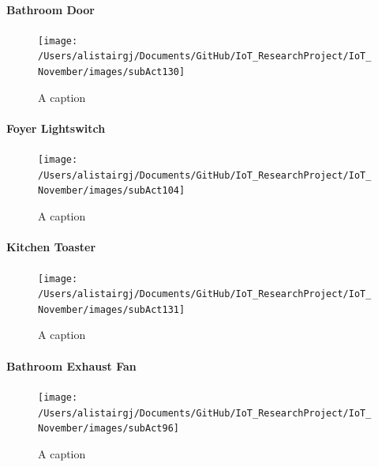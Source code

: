 \documentclass[11pt,]{article}
\let\oldparagraph\paragraph
\renewcommand{\paragraph}[1]{\oldparagraph{#1}\mbox{}}
\begin{document}
\hypertarget{bathroom-door}{%
\paragraph{Bathroom Door}\label{bathroom-door}}

\begin{figure}[H]

{\centering \texttt{[image: /Users/alistairgj/Documents/GitHub/IoT\_ResearchProject/IoT\_November/images/subAct130]} 

}

\caption{A caption}\label{fig:subAct130}
\end{figure}

\hypertarget{foyer-lightswitch}{%
\paragraph{Foyer Lightswitch}\label{foyer-lightswitch}}

\begin{figure}[H]

{\centering \texttt{[image: /Users/alistairgj/Documents/GitHub/IoT\_ResearchProject/IoT\_November/images/subAct104]} 

}

\caption{A caption}\label{fig:subAct104}
\end{figure}

\hypertarget{kitchen-toaster}{%
\paragraph{Kitchen Toaster}\label{kitchen-toaster}}

\begin{figure}[H]

{\centering \texttt{[image: /Users/alistairgj/Documents/GitHub/IoT\_ResearchProject/IoT\_November/images/subAct131]} 

}

\caption{A caption}\label{fig:subAct131}
\end{figure}

\hypertarget{bathroom-exhaust-fan}{%
\paragraph{Bathroom Exhaust Fan}\label{bathroom-exhaust-fan}}

\begin{figure}[H]

{\centering \texttt{[image: /Users/alistairgj/Documents/GitHub/IoT\_ResearchProject/IoT\_November/images/subAct96]} 

}

\caption{A caption}\label{fig:subAct96}
\end{figure}
\end{document}
